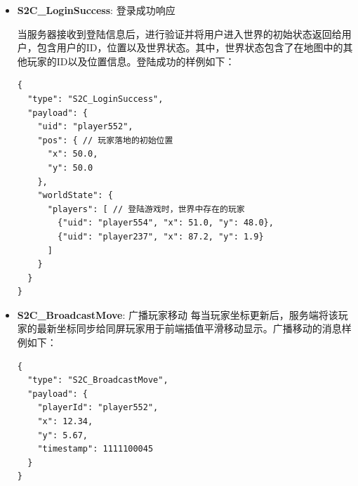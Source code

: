 \begin{itemize}
    \item \textbf{S2C\_LoginSuccess}: 登录成功响应

        当服务器接收到登陆信息后，进行验证并将用户进入世界的初始状态返回给用户，包含用户的ID，位置以及世界状态。其中，世界状态包含了在地图中的其他玩家的ID以及位置信息。登陆成功的样例如下：
\begin{tcolorbox}[title=S2C\_LoginSuccess]
\begin{verbatim}
{
  "type": "S2C_LoginSuccess",
  "payload": {
    "uid": "player552",
    "pos": { // 玩家落地的初始位置
      "x": 50.0,
      "y": 50.0
    },
    "worldState": {
      "players": [ // 登陆游戏时，世界中存在的玩家
        {"uid": "player554", "x": 51.0, "y": 48.0},
        {"uid": "player237", "x": 87.2, "y": 1.9}
      ]
    }
  }
}
\end{verbatim}
\end{tcolorbox}

    \item \textbf{S2C\_BroadcastMove}: 广播玩家移动
        每当玩家坐标更新后，服务端将该玩家的最新坐标同步给同屏玩家用于前端插值平滑移动显示。广播移动的消息样例如下：
\begin{tcolorbox}[title=S2C\_BroadcastMove]
\begin{verbatim}
{
  "type": "S2C_BroadcastMove",
  "payload": {
    "playerId": "player552",
    "x": 12.34,
    "y": 5.67,
    "timestamp": 1111100045
  }
}
\end{verbatim}
\end{tcolorbox}


\end{itemize}
